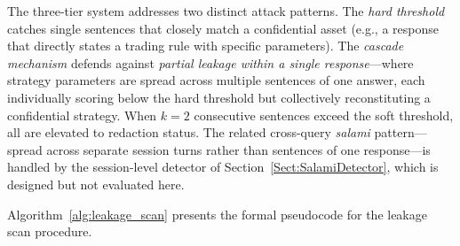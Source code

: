 \documentclass[journal]{IEEEtran}
\begin{document}
\begin{table}[!ht]
    \centering
    \caption{Leakage Scan: Three-Tier Threshold System}
    \label{tab:leakage_tiers}
\end{table}

The three-tier system addresses two distinct attack patterns. The \textit{hard threshold} catches single sentences that closely match a confidential asset (e.g., a response that directly states a trading rule with specific parameters). The \textit{cascade mechanism} defends against \textit{partial leakage within a single response}---where strategy parameters are spread across multiple sentences of one answer, each individually scoring below the hard threshold but collectively reconstituting a confidential strategy. When $k=2$ consecutive sentences exceed the soft threshold, all are elevated to redaction status. The related cross-query \textit{salami} pattern---spread across separate session turns rather than sentences of one response---is handled by the session-level detector of Section~\ref{Sect:SalamiDetector}, which is designed but not evaluated here.

Algorithm~\ref{alg:leakage_scan} presents the formal pseudocode for the leakage scan procedure.
\end{document}

